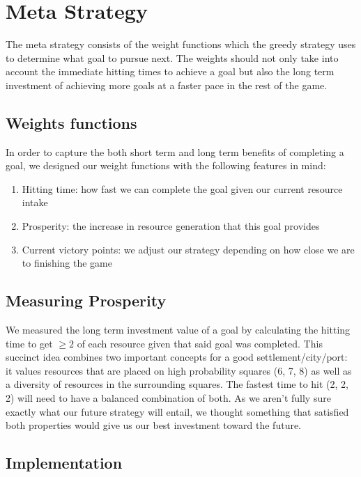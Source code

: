 \documentclass{article}
\begin{document}
\section*{Meta Strategy}

The meta strategy consists of the weight functions which the greedy strategy uses to determine what goal to pursue next. The weights should not only take into account the immediate hitting times to achieve a goal but also the long term investment of achieving more goals at a faster pace in the rest of the game.

\subsection*{Weights functions}

In order to capture the both short term and long term benefits of completing a goal, we designed our weight functions with the following features in mind:

\begin{enumerate}
    \item Hitting time: how fast we can complete the goal given our current resource intake
    \item Prosperity: the increase in resource generation that this goal provides
    \item Current victory points: we adjust our strategy depending on how close we are to finishing the game
\end{enumerate}

\subsection*{Measuring Prosperity}

We measured the long term investment value of a goal by calculating the hitting time to get $\geq 2$ of each resource given that said goal was completed.  This succinct idea combines two important concepts for a good settlement/city/port: it values resources that are placed on high probability squares (6, 7, 8) as well as a diversity of resources in the surrounding squares. The fastest time to hit (2, 2, 2) will need to have a balanced combination of both. As we aren’t fully sure exactly what our future strategy will entail, we thought something that satisfied both properties would give us our best investment toward the future.

\subsection*{Implementation}
\end{document}
